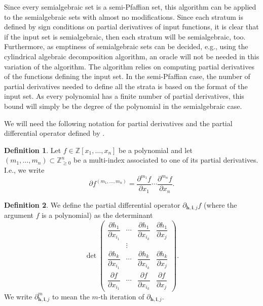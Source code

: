 \documentclass[
]{book}
\theoremstyle{definition}
\newtheorem{definition}{Definition}[chapter]
\theoremstyle{definition}
\theoremstyle{definition}
\theoremstyle{definition}
\theoremstyle{remark}
\begin{document}
Since every semialgebraic set is a semi-Pfaffian set, this algorithm can be applied to the semialgebraic sets with almost no modifications. Since each stratum is defined by sign conditions on partial derivatives of input functions, it is clear that if the input set is semialgebraic, then each stratum will be semialgebraic, too. Furthermore, as emptiness of semialgebraic sets can be decided, e.g., using the cylindrical algebraic decomposition algorithm, an oracle will not be needed in this variation of the algorithm.
The algorithm relies on computing partial derivatives of the functions defining the input set. In the semi-Pfaffian case, the number of partial derivatives needed to define all the strata is based on the format of the input set. As every polynomial has a finite number of partial derivatives, this bound will simply be the degree of the polynomial in the semialgebraic case.

We will need the following notation for partial derivatives and the partial differential operator defined by \citet{gv1995}.

\begin{definition}
\protect\hypertarget{def:pdo}{}\label{def:pdo}\citep[Definition 2]{gv1995}
Let \(f \in \mathbb{Z}[x_1,\ldots,x_n]\) be a polynomial and let \((m_1,\ldots,m_n) \subset \mathbb{Z}_{\ge 0}^n\) be a multi-index associated to one of its partial derivatives.
I.e., we write
\[
\partial f^{(m_1,\ldots,m_n)} =
\dfrac{\partial^{m_1} f}{\partial x_1} \cdots \dfrac{\partial^{m_n} f}{\partial x_n}.
\]
\end{definition}

\begin{definition}
\citep[Definition 2]{gv1995}
We define the partial differential operator \(\partial_{\mathbf{h}, \mathbf{i}, j} f\) (where the argument \(f\) is a polynomial) as the determinant
\[
\det\begin{pmatrix}\dfrac{\partial h_{1}}{\partial x_{i_{1}}} & \cdots & \dfrac{\partial h_{1}}{\partial x_{i_{k}}} & \dfrac{\partial h_{1}}{\partial x_{j}}\\
 & \vdots\\
\dfrac{\partial h_{k}}{\partial x_{i_{1}}} & \cdots & \dfrac{\partial h_{k}}{\partial x_{i_{k}}} & \dfrac{\partial h_{k}}{\partial x_{j}}\\
\dfrac{\partial f}{\partial x_{i_{1}}} & \cdots & \dfrac{\partial f}{\partial x_{i_{k}}} & \dfrac{\partial f}{\partial x_{j}}
\end{pmatrix}.
\]
We write \(\partial^m_{\mathbf{h}, \mathbf{i}, j}\) to mean the \(m\)-th iteration of \(\partial_{\mathbf{h}, \mathbf{i}, j}\).
\end{definition}
\end{document}
